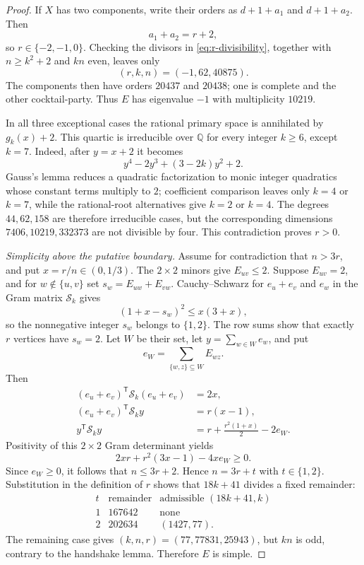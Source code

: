 \documentclass[a4paper,10pt,reqno]{amsart}
\theoremstyle{plain}
\theoremstyle{definition}
\theoremstyle{remark}
\begin{document}
\begin{proof}
If \(X\) has two components, write their orders as
\(d+1+a_1\) and \(d+1+a_2\).  Then
\[
 a_1+a_2=r+2,
\]
so \(r\in\{-2,-1,0\}\).  Checking the divisors in
\eqref{eq:r-divisibility}, together with \(n\ge k^2+2\) and \(kn\) even,
leaves only
\[
 (r,k,n)=(-1,62,40875).
\]
The components then have orders \(20437\) and \(20438\); one is complete
and the other cocktail-party.  Thus \(E\) has eigenvalue \(-1\) with
 multiplicity \(10219\).

 In all three exceptional cases the rational primary space is annihilated by
 \(g_k(x)+2\).  This quartic is irreducible over \(\mathbb Q\) for every
 integer \(k\ge6\), except \(k=7\).  Indeed, after \(y=x+2\) it becomes
 \[
  y^4-2y^3+(3-2k)y^2+2.
 \]
 Gauss's lemma reduces a quadratic factorization to monic integer quadratics
 whose constant terms multiply to \(2\); coefficient comparison leaves only
 \(k=4\) or \(k=7\), while the rational-root alternatives give \(k=2\) or
 \(k=4\).  The degrees \(44,62,158\) are therefore irreducible cases, but the
 corresponding dimensions \(7406,10219,332373\) are not divisible by four.
 This contradiction proves \(r>0\).

 \smallskip
\noindent\emph{Simplicity above the putative boundary.}
 Assume for contradiction that \(n>3r\), and put \(x=r/n\in(0,1/3)\).
 The \(2\times2\) minors give \(E_{uv}\le2\).  Suppose \(E_{uv}=2\), and
 for \(w\notin\{u,v\}\) set \(s_w=E_{uw}+E_{vw}\).  Cauchy--Schwarz for
 \(e_u+e_v\) and \(e_w\) in the Gram matrix \(\mathcal S_k\) gives
\[
 (1+x-s_w)^2\le x(3+x),
\]
 so the nonnegative integer \(s_w\) belongs to \(\{1,2\}\).  The row sums
 show that exactly \(r\) vertices have \(s_w=2\).  Let \(W\) be their set,
 let \(y=\sum_{w\in W}e_w\), and put
\[
  e_W=\sum_{\{w,z\}\subseteq W}E_{wz}.
\]
 Then
\[
 \begin{aligned}
  (e_u+e_v)^{\mathsf T}\mathcal S_k(e_u+e_v)&=2x,\\
  (e_u+e_v)^{\mathsf T}\mathcal S_k y&=r(x-1),\\
  y^{\mathsf T}\mathcal S_k y&=r+\frac{r^2(1+x)}2-2e_W.
 \end{aligned}
\]
 Positivity of this \(2\times2\) Gram determinant yields
 \[
  2xr+r^2(3x-1)-4xe_W\ge0.
 \]
 Since \(e_W\ge0\), it follows that \(n\le3r+2\).  Hence
 \(n=3r+t\) with \(t\in\{1,2\}\).  Substitution in the definition of \(r\)
 shows that \(18k+41\) divides a fixed remainder:
 \[
 \begin{array}{c|c|c}
  t&\text{remainder}&\text{admissible }(18k+41,k)\\
  \hline
  1&167642&\text{none}\\
  2&202634&(1427,77).
 \end{array}
 \]
 The remaining case gives \((k,n,r)=(77,77831,25943)\), but \(kn\) is odd,
 contrary to the handshake lemma.  Therefore \(E\) is simple.


\end{proof}
\end{document}
